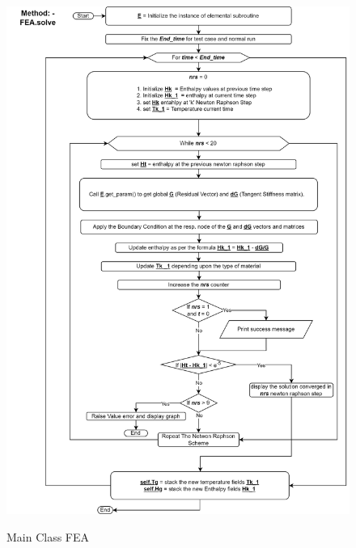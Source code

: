 \begin{figure}[htb]
  \centering
  \includegraphics[width=13cm]{img/FEA_Solve.png}\\
  \caption{Main Class FEA}
  \label{fig:FEA_Solve}
\end{figure}

